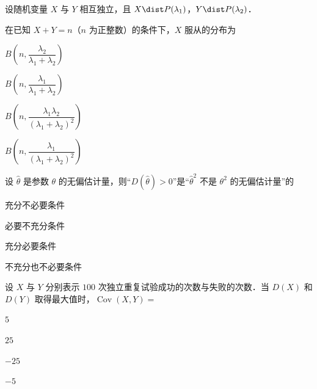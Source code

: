 \begin{question}[index=8]
设随机变量 $X$ 与 $Y$ 相互独立，且 $X\dist P(\lambda_1)$，$Y\dist P(\lambda_2)$．
\par 在已知 $X+Y=n$（$n$ 为正整数）的条件下，$X$ 服从的分布为
\begin{choices}[columns=1]
\item $B\!\left(n,\dfrac{\lambda_2}{\lambda_1+\lambda_2}\right)$
\item $B\!\left(n,\dfrac{\lambda_1}{\lambda_1+\lambda_2}\right)$
\item $B\!\left(n,\dfrac{\lambda_1\lambda_2}{(\lambda_1+\lambda_2)^2}\right)$
\item $B\!\left(n,\dfrac{\lambda_1}{(\lambda_1+\lambda_2)^2}\right)$
\end{choices}
\end{question}
\QuestionBreak

\begin{question}[index=9]
设 $\widehat\theta$ 是参数 $\theta$ 的无偏估计量，则“$D(\widehat\theta)>0$”是“$\widehat\theta^2$ 不是 $\theta^2$ 的无偏估计量”的
\begin{choices}[columns=4]
\item 充分不必要条件
\item 必要不充分条件
\item 充分必要条件
\item 不充分也不必要条件
\end{choices}
\end{question}
\QuestionBreak

\begin{question}[index=10]
设 $X$ 与 $Y$ 分别表示 $100$ 次独立重复试验成功的次数与失败的次数．当 $D(X)$ 和 $D(Y)$ 取得最大值时，$\operatorname{Cov}(X,Y)=$
\begin{choices}[columns=4]
\item $5$
\item $25$
\item $-25$
\item $-5$
\end{choices}
\end{question}
